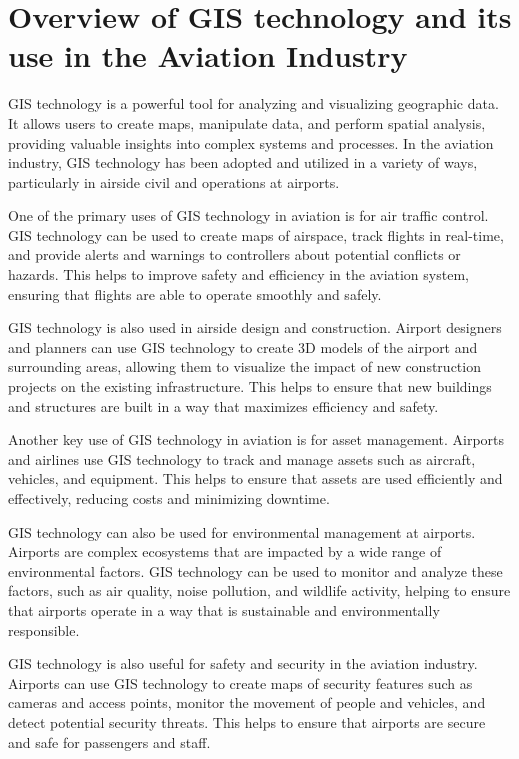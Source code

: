 
\setchapterpreamble[u]{\margintoc}

\chapter{Overview of GIS technology and its use in the Aviation Industry}%
\label{chap:gisoverview}

\graphicspath{{./figs}}

GIS technology is a powerful tool for analyzing and visualizing geographic data. It allows users to create maps, manipulate data, and perform spatial analysis, providing valuable insights into complex systems and processes. In the aviation industry, GIS technology has been adopted and utilized in a variety of ways, particularly in airside civil and operations at airports.

One of the primary uses of GIS technology in aviation is for air traffic control. GIS technology can be used to create maps of airspace, track flights in real-time, and provide alerts and warnings to controllers about potential conflicts or hazards. This helps to improve safety and efficiency in the aviation system, ensuring that flights are able to operate smoothly and safely.

GIS technology is also used in airside design and construction. Airport designers and planners can use GIS technology to create 3D models of the airport and surrounding areas, allowing them to visualize the impact of new construction projects on the existing infrastructure. This helps to ensure that new buildings and structures are built in a way that maximizes efficiency and safety.

Another key use of GIS technology in aviation is for asset management. Airports and airlines use GIS technology to track and manage assets such as aircraft, vehicles, and equipment. This helps to ensure that assets are used efficiently and effectively, reducing costs and minimizing downtime.

GIS technology can also be used for environmental management at airports. Airports are complex ecosystems that are impacted by a wide range of environmental factors. GIS technology can be used to monitor and analyze these factors, such as air quality, noise pollution, and wildlife activity, helping to ensure that airports operate in a way that is sustainable and environmentally responsible.

GIS technology is also useful for safety and security in the aviation industry. Airports can use GIS technology to create maps of security features such as cameras and access points, monitor the movement of people and vehicles, and detect potential security threats. This helps to ensure that airports are secure and safe for passengers and staff.

